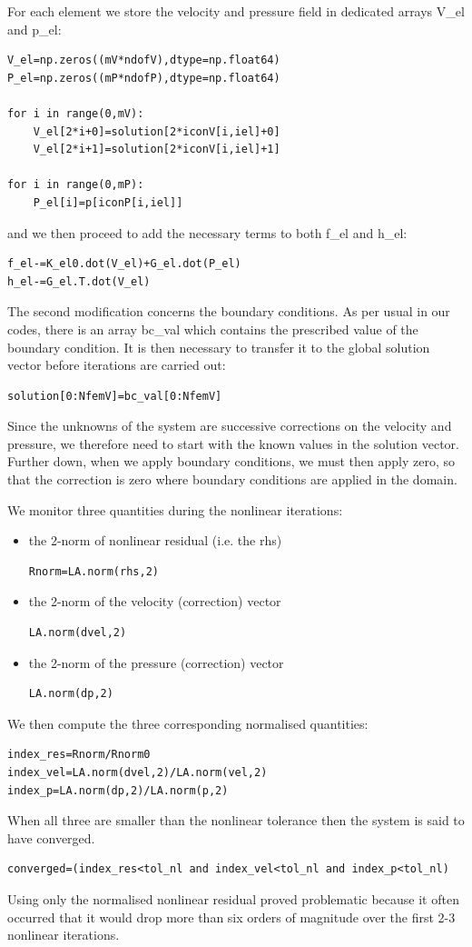 For each element we store the velocity and pressure field in dedicated arrays
{\codefont V\_el} and {\codefont p\_el}:

\begin{lstlisting}
V_el=np.zeros((mV*ndofV),dtype=np.float64)
P_el=np.zeros((mP*ndofP),dtype=np.float64)

for i in range(0,mV):
    V_el[2*i+0]=solution[2*iconV[i,iel]+0]
    V_el[2*i+1]=solution[2*iconV[i,iel]+1]

for i in range(0,mP):
    P_el[i]=p[iconP[i,iel]]
\end{lstlisting}
and we then proceed to add the necessary terms to both {\codefont f\_el} and {\codefont h\_el}:
\begin{lstlisting}
f_el-=K_el0.dot(V_el)+G_el.dot(P_el) 
h_el-=G_el.T.dot(V_el)               
\end{lstlisting}

The second modification concerns the boundary conditions. 
As per usual in our codes, there is an array {\codefont bc\_val} 
which contains the prescribed value of the boundary condition.
It is then necessary to transfer it to the global solution vector 
before iterations are carried out:
\begin{lstlisting}
solution[0:NfemV]=bc_val[0:NfemV]
\end{lstlisting}
Since the unknowns of the system are successive corrections on the 
velocity and pressure, we therefore need to start with the known 
values in the solution vector. Further down, when we apply boundary conditions, 
we must then apply zero, so that the correction is zero where 
boundary conditions are applied in the domain.  

We monitor three quantities during the nonlinear iterations:
\begin{itemize}
\item the 2-norm of nonlinear residual (i.e. the rhs)
\begin{lstlisting}
Rnorm=LA.norm(rhs,2) 
\end{lstlisting}
\item the 2-norm of the velocity (correction) vector
\begin{lstlisting}
LA.norm(dvel,2)
\end{lstlisting}
\item the 2-norm of the pressure (correction) vector
\begin{lstlisting}
LA.norm(dp,2)
\end{lstlisting}
\end{itemize}
We then compute the three corresponding normalised quantities:
\begin{lstlisting}
index_res=Rnorm/Rnorm0
index_vel=LA.norm(dvel,2)/LA.norm(vel,2)
index_p=LA.norm(dp,2)/LA.norm(p,2)
\end{lstlisting}
When all three are smaller than the nonlinear tolerance then the system is said to have converged. 
\begin{lstlisting}
converged=(index_res<tol_nl and index_vel<tol_nl and index_p<tol_nl)
\end{lstlisting}
Using only the normalised nonlinear residual proved problematic because it often occurred that it would drop 
more than six orders of magnitude over the first 2-3 nonlinear iterations. 

